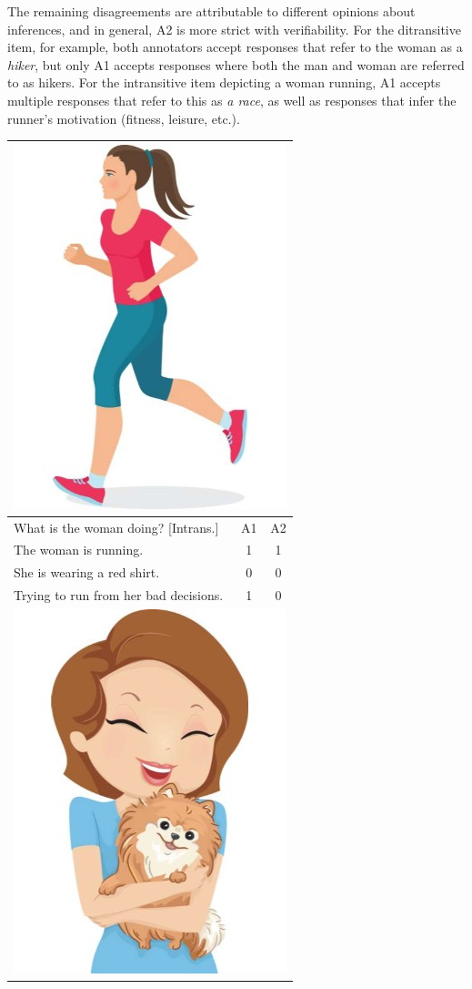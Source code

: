 \documentclass[11pt,a4paper]{article}
\begin{document}
The remaining disagreements are attributable to different opinions about inferences, and in general, A2 is more strict with verifiability.  For the ditransitive item, for example, both annotators accept responses that refer to the woman as a \textit{hiker}, but only A1 accepts responses where both the man and woman are referred to as hikers. For the intransitive item depicting a woman running, A1 accepts multiple responses that refer to this as \textit{a race}, as well as responses that infer the runner's motivation (fitness, leisure, etc.).

\begin{table}[t!]
\begin{center}
\begin{tabular}{|l|c|c|}
\hline
\multicolumn{3}{|c|}{\includegraphics[width=0.35\columnwidth]{figures/I30.jpg}} \\
\hline
What is the woman doing? [Intrans.] & A1 & A2 \\
\hline
The woman is running. & 1 & 1 \\
\hline
She is wearing a red shirt. & 0 & 0 \\
\hline
Trying to run from her bad decisions. & 1 & 0 \\
\hline
\hline
\multicolumn{3}{|c|}{\includegraphics[width=0.35\columnwidth]{figures/I29.jpg}} \\

\end{tabular}
\end{center}
\end{table}
\end{document}
